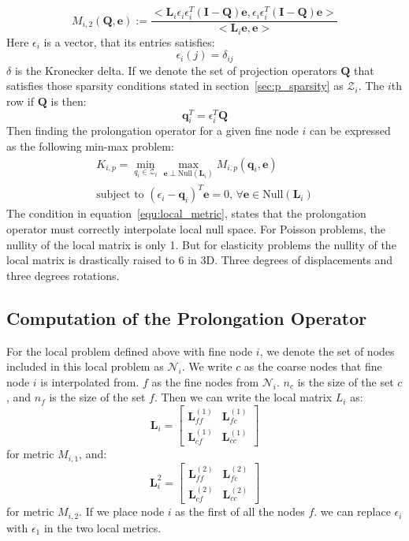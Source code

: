 \begin{equation}
M_{i,2}(\mathbf{Q},\mathbf{e}) := \frac{<\mathbf{L}_i\epsilon_i\epsilon^T_i(\mathbf{I}-\mathbf{Q})\mathbf{e}, \epsilon_i\epsilon^T_i(\mathbf{I}-\mathbf{Q})\mathbf{e}>}{<\mathbf{L}_i\mathbf{e},\mathbf{e}>}
\end{equation}
Here $\epsilon_i$ is a vector, that its entries satisfies:
$$
\epsilon_i(j) = \delta_{ij} 
$$
$\delta$ is the Kronecker delta. If we denote the set of projection operators $\mathbf{Q}$ that satisfies those sparsity conditions stated in section~\ref{sec:p_sparsity} as $\mathcal{Z}_i$. The $i$th row if $\mathbf{Q}$ is then:
$$
\mathbf{q}^T_i = \epsilon^T_i\mathbf{Q}
$$
 Then finding the prolongation operator for a given fine node $i$ can be expressed as the following min-max problem:
 \begin{align}
 K_{i,p} = \min_{q_i \in \mathcal{Z}_i} \max_{\mathbf{e}\perp \text{Null}(\mathbf{L}_i)} M_{i,p}(\mathbf{q}_i,\mathbf{e})\nonumber\\
 \text{subject to } (\epsilon_i - \mathbf{q}_i) ^ T \mathbf{e} = 0\text{, }\forall \mathbf{e} \in \text{Null}(\mathbf{L}_i) \label{equ:local_metric}
 \end{align}
 The condition in equation~\ref{equ:local_metric}, states that the prolongation operator must correctly interpolate local null space. For Poisson problems, the nullity of the local matrix is only 1. But for elasticity problems the nullity of the local matrix is drastically raised to 6 in 3D. Three degrees of displacements and three degrees rotations. 
 \subsection{Computation of the Prolongation Operator}
 For the local problem defined above with fine node $i$, we denote the set of nodes included in this local problem as $\mathcal{N}_i$. We write $c$ as the coarse nodes that fine node $i$ is interpolated from. $f$ as the fine nodes from $\mathcal{N}_i$. $n_c$ is the size of the set $c$, and $n_f$ is the size of the set $f$. Then we can write the local matrix $L_i$ as:
 $$
\mathbf{L}_i = \begin{bmatrix} 
 \mathbf{L}^{(1)}_{ff} & \mathbf{L}^{(1)}_{fc} \\
 \mathbf{L}^{(1)}_{cf} & \mathbf{L}^{(1)}_{cc}
 \end{bmatrix}
 $$
 for metric $M_{i,1}$, and:
  $$
 \mathbf{L}^2_i = \begin{bmatrix} 
 \mathbf{L}^{(2)}_{ff} & \mathbf{L}^{(2)}_{fc} \\
 \mathbf{L}^{(2)}_{cf} & \mathbf{L}^{(2)}_{cc}
 \end{bmatrix}
 $$
 for metric $M_{i,2}$. If we place node $i$ as the first of all the nodes $f$. we can replace $\epsilon_i$ with $\epsilon_1$ in the two local metrics. 
 
